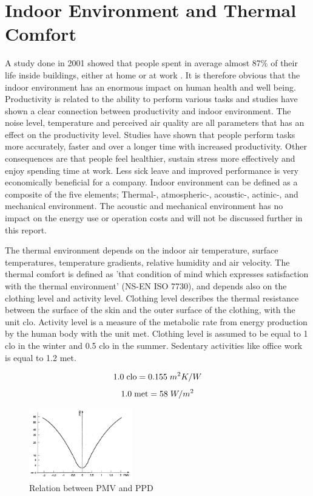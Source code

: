 \section{Indoor Environment and Thermal Comfort}
A study done in 2001 showed that people spent in average almost 87\% of their life inside buildings, either at home or at work \cite{Nhaps}. It is therefore obvious that the indoor environment has an enormous impact on human health and well being. Productivity is related to the ability to perform various tasks and studies have shown a clear connection between productivity and indoor environment. The noise level, temperature and perceived air quality are all parameters that has an effect on the productivity level. Studies have shown that people perform tasks more accurately, faster and over a longer time with increased productivity. Other consequences are that people feel healthier, sustain stress more effectively and enjoy spending time at work. Less sick leave and improved performance is very economically beneficial for a company.
Indoor environment can be defined as a composite of the five elements; Thermal-, atmospheric-, acoustic-, actinic-, and mechanical environment. The acoustic and mechanical environment has no impact on the energy use or operation costs and will not be discussed further in this report.

The thermal environment depends on the indoor air temperature, surface temperatures, temperature gradients, relative humidity and air velocity. The thermal comfort is defined as 'that condition of mind which expresses satisfaction with the thermal environment' (NS-EN ISO 7730), and depends also on the clothing level and activity level. Clothing level describes the thermal resistance between the surface of the skin and the outer surface of the clothing, with the unit clo. Activity level is a measure of the metabolic rate from energy production by the human body with the unit met. Clothing level is assumed to be equal to 1 clo in the winter and 0.5 clo in the summer. Sedentary activities like office work is equal to 1.2 met. 

$$ 1.0 \hspace{1mm} \mbox{clo} = 0.155 \hspace{1mm} m^2K/W$$
$$ 1.0 \hspace{1mm} \mbox{met} = 58 \hspace{1mm} W/m^2 $$

\begin{figure}
    \centering
    \vspace{-4mm}
    \includegraphics[width=0.4\textwidth]{vedlegg/pmvppd.png}
    \caption{Relation between PMV and PPD}
    \label{fig:my_label}
 \end{figure}
 
